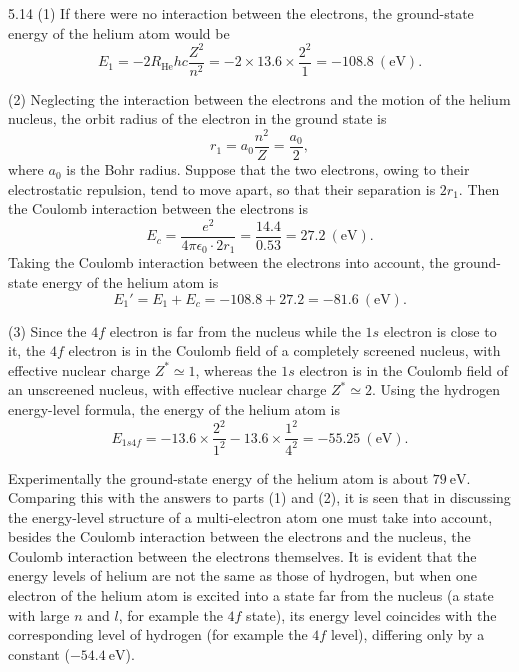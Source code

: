 \begin{solution}{5.14}
(1) If there were no interaction between the electrons, the ground-state energy of the helium
atom would be
\begin{equation*}
E_1=-2R_{\mathrm{He}}hc\frac{Z^2}{n^2}=-2\times 13.6\times\frac{2^2}{1}=-108.8\ (\mathrm{eV}).
\end{equation*}

(2) Neglecting the interaction between the electrons and the motion of the helium nucleus, the
orbit radius of the electron in the ground state is
\begin{equation*}
r_1=a_0\frac{n^2}{Z}=\frac{a_0}{2},
\end{equation*}
where $a_0$ is the Bohr radius. Suppose that the two electrons, owing to their electrostatic
repulsion, tend to move apart, so that their separation is $2r_1$. Then the Coulomb interaction
between the electrons is
\begin{equation*}
E_c=\frac{e^2}{4\pi\epsilon_0\cdot 2r_1}=\frac{14.4}{0.53}=27.2\ (\mathrm{eV}).
\end{equation*}
Taking the Coulomb interaction between the electrons into account, the ground-state energy of
the helium atom is
\begin{equation*}
E_1'=E_1+E_c=-108.8+27.2=-81.6\ (\mathrm{eV}).
\end{equation*}

(3) Since the $4f$ electron is far from the nucleus while the $1s$ electron is close to it, the
$4f$ electron is in the Coulomb field of a completely screened nucleus, with effective nuclear
charge $Z^*\simeq 1$, whereas the $1s$ electron is in the Coulomb field of an unscreened
nucleus, with effective nuclear charge $Z^*\simeq 2$. Using the hydrogen energy-level formula,
the energy of the helium atom is
\begin{equation*}
E_{1s4f}=-13.6\times\frac{2^2}{1^2}-13.6\times\frac{1^2}{4^2}=-55.25\ (\mathrm{eV}).
\end{equation*}

\begin{commentary}
Experimentally the ground-state energy of the helium atom is about $79\ \mathrm{eV}$. Comparing
this with the answers to parts (1) and (2), it is seen that in discussing the energy-level
structure of a multi-electron atom one must take into account, besides the Coulomb interaction
between the electrons and the nucleus, the Coulomb interaction between the electrons themselves.
It is evident that the energy levels of helium are not the same as those of hydrogen, but when
one electron of the helium atom is excited into a state far from the nucleus (a state with large
$n$ and $l$, for example the $4f$ state), its energy level coincides with the corresponding
level of hydrogen (for example the $4f$ level), differing only by a constant ($-54.4\
\mathrm{eV}$).
\end{commentary}
\end{solution}

